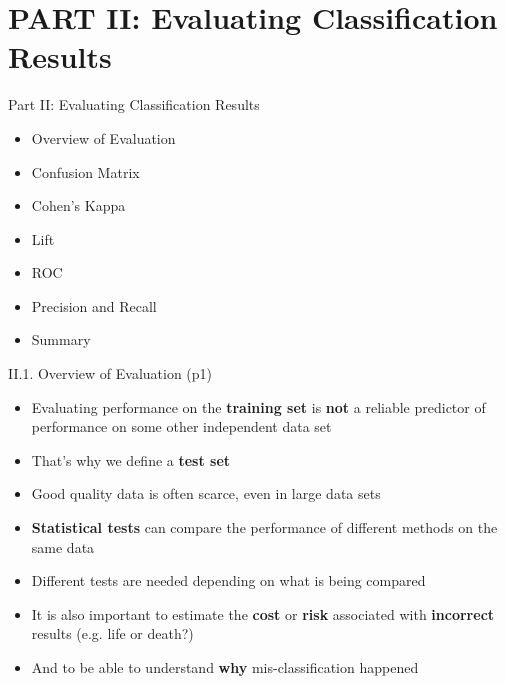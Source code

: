 \documentclass[handout]{beamer}
\newcommand{\strong}[1]{\textbf{\color{teal} #1}}
\newcommand{\stronger}[1]{\textbf{\color{purple} #1}}
\begin{document}
\section{PART II: Evaluating Classification Results}
\begin{frame}{Part II: Evaluating Classification Results}
\begin{itemize}
\item[II.1.] Overview of Evaluation
\item[II.2.] Confusion Matrix
\item[II.3.] Cohen's Kappa
\item[II.4.] Lift
\item[II.5.] ROC
\item[II.6.] Precision and Recall
\item[II.7.] Summary
\end{itemize}
\end{frame}
\begin{frame}{II.1. Overview of Evaluation (p1)}
\begin{itemize}
\item Evaluating performance on the \strong{training set} is \textbf{not} a reliable predictor of performance on some other independent data set
\item[--] That's why we define a \strong{test set}
\item[--] Good quality data is often scarce, even in large data sets
\item \strong{Statistical tests} can compare the performance of different methods on the same data
\item[--] Different tests are needed depending on what is being compared
\item It is also important to estimate the \strong{cost} or \strong{risk} associated with \stronger{incorrect} results (e.g. life or death?)
\item And to be able to understand \stronger{why} mis-classification happened
\end{itemize}
\end{frame}
\end{document}
